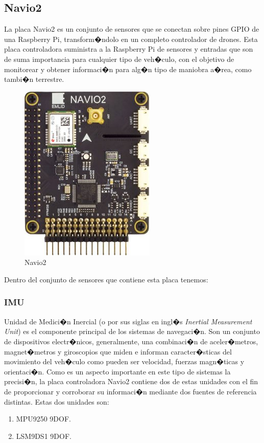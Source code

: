 	\subsection{Navio2}
		La placa Navio2 es un conjunto de sensores que se conectan sobre pines GPIO de una Raspberry Pi, transform�ndolo en un completo controlador de drones. Esta placa controladora suministra a la Raspberry Pi de sensores y entradas que son de suma importancia para cualquier tipo de veh�culo, con el objetivo de monitorear y obtener informaci�n para alg�n tipo de maniobra a�rea, como tambi�n terrestre.
		
		\begin{figure}[h!]
			\centering
			\includegraphics[width=0.4\linewidth, height=0.25\textheight]{Imagenes/navio22}
			\caption{Navio2}
			\label{fig:navio2}
		\end{figure}
		
		Dentro del conjunto de sensores que contiene esta placa tenemos:
		
	\subsubsection{IMU}
		Unidad de Medici�n Inercial (o por sus siglas en ingl�s \textit{Inertial Measurement Unit}) es el componente principal de los sistemas de navegaci�n. Son un conjunto de dispositivos electr�nicos, generalmente, una combinaci�n de aceler�metros, magnet�metros y giroscopios que miden e informan caracter�sticas del movimiento del veh�culo como pueden ser velocidad, fuerzas magn�ticas y orientaci�n. Como es un aspecto importante en este tipo de sistemas la precisi�n, la placa controladora Navio2 contiene dos de estas unidades con el fin de proporcionar y corroborar su informaci�n mediante dos fuentes de referencia distintas. Estas dos unidades son:
		
		\begin{enumerate}
			\item MPU9250 9DOF.
			\item LSM9DS1 9DOF.
			
		\end{enumerate}

